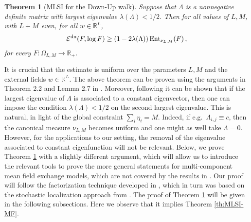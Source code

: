 \documentclass[11pt,reqno]{amsart}
\numberwithin{equation}{section}
\numberwithin{figure}{section}
\newtheorem{theorem}{Theorem}[section]
\newcommand{\1}{\mathds{1}}
\let\L=\Lambda
\newcommand{\bbR}{{\ensuremath{\mathbb R}} }
\begin{document}
\begin{theorem}[MLSI for the Down-Up walk]\label{MLSI DOWN UP}
Suppose that \(\Lambda\) is a nonnegative definite matrix with largest eigenvalue \(\lambda(\Lambda) < 1/2\). Then %
for all values of $L,M$, with $L+M$ even, for all $w\in\bbR^L$,
\[
\mathcal{E}^{\rm du}(F, \log F)\ge (1 - 2\lambda(\Lambda))\, \mathrm{Ent}_{\nu_{L,M}}(F) \,,
\]
for every \(F : \Omega_{L,M} \to \bbR_+\).
\end{theorem}
It is crucial that the estimate is uniform over the parameters $L,M$ and the external fields $w\in\bbR^L$. The above theorem can be proven using the arguments in Theorem 2.2 and Lemma 2.7 in \cite{bauerschmidt2024kawasaki}. Moreover, following \cite{bauerschmidt2024kawasaki} it can be shown that if the largest eigenvalue of $\L$ is associated to a constant eigenvector, then one can impose the condition \(\lambda(\Lambda) < 1/2\) on the second largest eigenvalue. This is natural, in light of the global constraint $\sum_i\eta_i=M$. Indeed, if e.g.\ $\L_{i,j}\equiv c$, then the canonical measure $\nu_{L,M}$ becomes uniform and one might as well take $\L=0$. However, for the applications to our setting, the removal of the eigenvalue associated to constant eigenfunction will not be relevant. Below, we prove Theorem \ref{MLSI DOWN UP} with a slightly different argument, which will allow us to introduce the relevant tools to prove the more general statements for multi-component mean field exchange models, which are not covered by the results in  \cite{bauerschmidt2024kawasaki}. Our proof will follow the factorization technique developed in \cite{caputo2025factorizations}, which in turn was based on the stochastic localization approach from \cite{chen2022localization}. 
The proof of Theorem \ref{MLSI DOWN UP} will be given in the following subsections. Here we observe that it implies Theorem \ref{th:MLSI-MF}.
\end{document}
